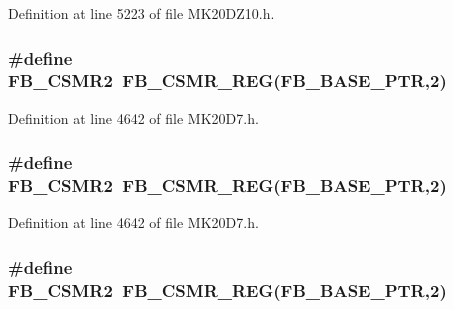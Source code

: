 Definition at line 5223 of file M\+K20\+D\+Z10.\+h.

\subsubsection[{\texorpdfstring{F\+B\+\_\+\+C\+S\+M\+R2}{FB_CSMR2}}]{\setlength{\rightskip}{0pt plus 5cm}\#define F\+B\+\_\+\+C\+S\+M\+R2~{\bf F\+B\+\_\+\+C\+S\+M\+R\+\_\+\+R\+EG}({\bf F\+B\+\_\+\+B\+A\+S\+E\+\_\+\+P\+TR},2)}\hypertarget{group___f_b___register___accessor___macros_ga714542115e32871df2f596d34f9778f2}{}\label{group___f_b___register___accessor___macros_ga714542115e32871df2f596d34f9778f2}


Definition at line 4642 of file M\+K20\+D7.\+h.

\subsubsection[{\texorpdfstring{F\+B\+\_\+\+C\+S\+M\+R2}{FB_CSMR2}}]{\setlength{\rightskip}{0pt plus 5cm}\#define F\+B\+\_\+\+C\+S\+M\+R2~{\bf F\+B\+\_\+\+C\+S\+M\+R\+\_\+\+R\+EG}({\bf F\+B\+\_\+\+B\+A\+S\+E\+\_\+\+P\+TR},2)}\hypertarget{group___f_b___register___accessor___macros_ga714542115e32871df2f596d34f9778f2}{}\label{group___f_b___register___accessor___macros_ga714542115e32871df2f596d34f9778f2}


Definition at line 4642 of file M\+K20\+D7.\+h.

\subsubsection[{\texorpdfstring{F\+B\+\_\+\+C\+S\+M\+R2}{FB_CSMR2}}]{\setlength{\rightskip}{0pt plus 5cm}\#define F\+B\+\_\+\+C\+S\+M\+R2~{\bf F\+B\+\_\+\+C\+S\+M\+R\+\_\+\+R\+EG}({\bf F\+B\+\_\+\+B\+A\+S\+E\+\_\+\+P\+TR},2)}\hypertarget{group___f_b___register___accessor___macros_ga714542115e32871df2f596d34f9778f2}{}\label{group___f_b___register___accessor___macros_ga714542115e32871df2f596d34f9778f2}


